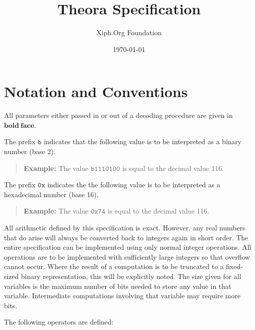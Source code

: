 \documentclass[9pt,letterpaper]{book}
\title{Theora Specification}
\author{Xiph.Org Foundation}
\date{\today}
\newcommand{\bitvar}[1]{\ensuremath{\mathbf{\bm{#1}}}}
\newcommand{\bin}[1]{\ensuremath{\mathtt{b#1}}}
\newcommand{\hex}[1]{\ensuremath{\mathtt{0x#1}}}
\numberwithin{equation}{chapter}
\numberwithin{figure}{chapter}
\numberwithin{table}{chapter}
\begin{document}
\frontmatter

\begin{titlepage}
\maketitle
\end{titlepage}
\thispagestyle{empty}
\cleardoublepage


\thispagestyle{plain}
\tableofcontents
\cleardoublepage

\thispagestyle{plain}
\listoffigures
\cleardoublepage

\thispagestyle{plain}
\listoftables
\cleardoublepage

\thispagestyle{plain}
\chapter*{Notation and Conventions}

All parameters either passed in or out of a decoding procedure are given in
 \bitvar{bold\ face}.

The prefix \bin{} indicates that the following value is to be interpreted as a
 binary number (base 2).
\begin{verse}
{\bf Example:} The value \bin{1110100} is equal to the decimal value 116.
\end{verse}

The prefix \hex{} indicates the the following value is to be interpreted as a
 hexadecimal number (base 16).
\begin{verse}
{\bf Example:} The value \hex{74} is equal to the decimal value 116.
\end{verse}

All arithmetic defined by this specification is exact.
However, any real numbers that do arise will always be converted back to
 integers again in short order.
The entire specification can be implemented using only normal integer
 operations.
All operations are to be implemented with sufficiently large integers so that
 overflow cannot occur.
Where the result of a computation is to be truncated to a fixed-sized binary
 representation, this will be explicitly noted.
The size given for all variables is the maximum number of bits needed to store
 any value in that variable.
Intermediate computations involving that variable may require more bits.

The following operators are defined:
\end{document}
